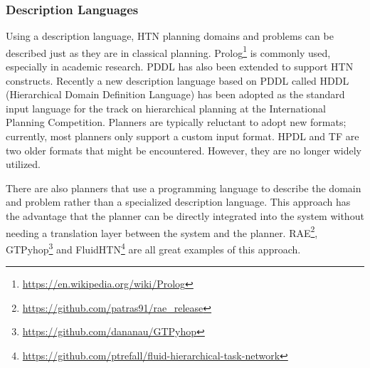 \subsubsection{Description Languages}
Using a description language, HTN planning domains and problems can be described just as they are in classical planning. Prolog\footnote{\url{https://en.wikipedia.org/wiki/Prolog}} is commonly used, especially in academic research. PDDL has also been extended to support HTN constructs. Recently a new description language based on PDDL called HDDL (Hierarchical Domain Definition Language) has been adopted as the standard input language for the track on hierarchical planning at the International Planning Competition. Planners are typically reluctant to adopt new formats; currently, most planners only support a custom input format. HPDL and TF are two older formats that might be encountered. However, they are no longer widely utilized.


\begin{table}[H]
    \centering
    \caption{The stack task from the block-world domain in different formats.}
    \label{tab:my-table}
\end{table}



There are also planners that use a programming language to describe the domain and problem rather than a specialized description language. This approach has the advantage that the planner can be directly integrated into the system without needing a translation layer between the system and the planner. RAE\footnote{\url{https://github.com/patras91/rae_release}}, GTPyhop\footnote{\url{https://github.com/dananau/GTPyhop}} and FluidHTN\footnote{\url{https://github.com/ptrefall/fluid-hierarchical-task-network}} are all great examples of this approach.

